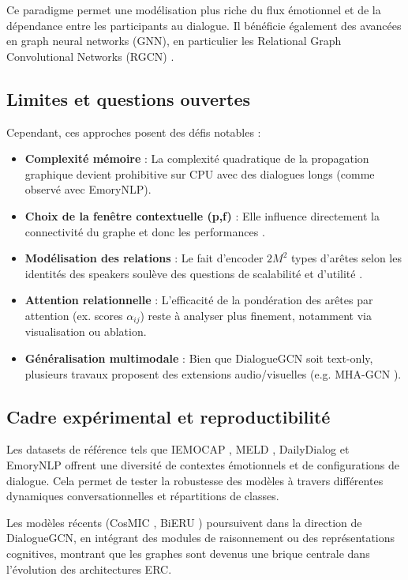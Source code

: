 \documentclass[a4paper,11pt]{article}
\begin{document}
Ce paradigme permet une modélisation plus riche du flux émotionnel et de la dépendance entre les participants au dialogue. Il bénéficie également des avancées en graph neural networks (GNN), en particulier les Relational Graph Convolutional Networks (RGCN) \cite{schlichtkrull2018modeling}.

\subsection{Limites et questions ouvertes}
Cependant, ces approches posent des défis notables :

\begin{itemize}
    \item \textbf{Complexité mémoire} : La complexité quadratique de la propagation graphique devient prohibitive sur CPU avec des dialogues longs (comme observé avec EmoryNLP).
    \item \textbf{Choix de la fenêtre contextuelle (p,f)} : Elle influence directement la connectivité du graphe et donc les performances \cite{li2020graph}.
    \item \textbf{Modélisation des relations} : Le fait d'encoder $2M^2$ types d'arêtes selon les identités des speakers soulève des questions de scalabilité et d'utilité \cite{he2021hierarchical}.
    \item \textbf{Attention relationnelle} : L'efficacité de la pondération des arêtes par attention (ex. scores $\alpha_{ij}$) reste à analyser plus finement, notamment via visualisation ou ablation.
    \item \textbf{Généralisation multimodale} : Bien que DialogueGCN soit text-only, plusieurs travaux proposent des extensions audio/visuelles (e.g. MHA-GCN \cite{zhao2021multi}).
\end{itemize}

\subsection{Cadre expérimental et reproductibilité}
Les datasets de référence tels que IEMOCAP \cite{busso2008iemocap}, MELD \cite{poria2018meld}, DailyDialog \cite{li2017dailydialog} et EmoryNLP \cite{zahiri2018emotion} offrent une diversité de contextes émotionnels et de configurations de dialogue. Cela permet de tester la robustesse des modèles à travers différentes dynamiques conversationnelles et répartitions de classes.

Les modèles récents (CosMIC \cite{li2023cosmic}, BiERU \cite{lin2022bieru}) poursuivent dans la direction de DialogueGCN, en intégrant des modules de raisonnement ou des représentations cognitives, montrant que les graphes sont devenus une brique centrale dans l'évolution des architectures ERC.
\end{document}
